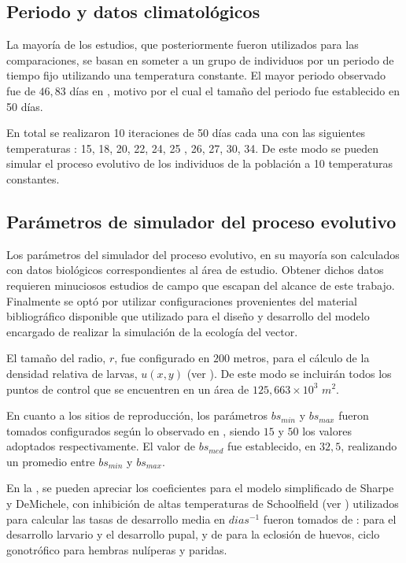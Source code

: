 \subsection{Periodo y datos climatológicos}
La mayoría de los estudios, que posteriormente fueron utilizados para las comparaciones, se basan
en someter a un grupo de individuos por un periodo de tiempo fijo utilizando una temperatura
constante. El mayor periodo observado fue de $46,83$ días en \cite{rueda1990temperature}, motivo
por el cual el tamaño del periodo fue establecido en 50 días.

En total se realizaron 10 iteraciones de 50 días cada una con las siguientes temperaturas :
15\textcelsius , 18\textcelsius , 20\textcelsius , 22\textcelsius , 24\textcelsius , 25\textcelsius
, 26\textcelsius , 27\textcelsius , 30\textcelsius , 34\textcelsius. De este modo se pueden simular
el proceso evolutivo de los individuos de la población a 10 temperaturas constantes.

\subsection{Parámetros de simulador del proceso evolutivo}
Los parámetros del simulador del proceso evolutivo, en su mayoría son calculados con datos
biológicos correspondientes al área de estudio. Obtener dichos datos requieren minuciosos estudios
de campo que escapan del alcance de este trabajo. Finalmente se optó por utilizar configuraciones
provenientes del material bibliográfico disponible que utilizado para el diseño y desarrollo del
modelo encargado de realizar la simulación de la ecología del vector.

El tamaño del radio, $r$, fue configurado en $200$ metros, para el cálculo de la densidad relativa
de larvas, $u(x,y)$ (ver ). De este modo se incluirán todos los
puntos de control que se encuentren en un área de $125,663 \times 10^{3}$ $m^{2}$.

En cuanto a los sitios de reproducción, los parámetros $bs_{min}$ y $bs_{max}$ fueron tomados
configurados según lo observado en \cite{otero2006stochastic, otero2008stochastic}, siendo $15$ y
$50$ los valores adoptados respectivamente.  El valor de $bs_{med}$ fue establecido, en $32,5$,
realizando un promedio entre $bs_{min}$ y $bs_{max}$.

En la , se pueden apreciar los coeficientes para el modelo
simplificado de Sharpe y DeMichele, con inhibición de altas temperaturas de Schoolfield (ver
) utilizados para calcular las tasas de desarrollo media
en $dias^{-1}$ fueron tomados de : \cite{rueda1990temperature} para el desarrollo larvario y el
desarrollo pupal, y de \cite{otero2006stochastic} para la eclosión de huevos, ciclo gonotrófico para hembras nulíperas y paridas.


